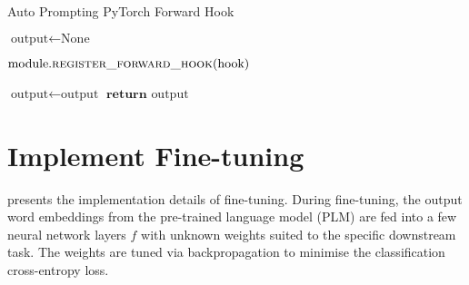 \begin{algorithm}
\caption{Auto Prompting PyTorch Forward Hook} \label{alg:appendix-auto-forward-hook}
\begin{algorithmic}[1]
\small
{}

\State $\text{output} \gets \text{None}$
{\color{mylightgrey}}

\State $\text{module}.\Call{\text{register\_forward\_hook}}{\text{hook}}$  
{\color{mylightgrey}}
\EndProcedure

  \State $\text{output} \gets \text{output}$ 
  {\color{mylightgrey}}
\EndProcedure
{}
  \State $\textbf{return } \text{output}$ 
  {\color{mylightgrey}}
\EndProcedure
\EndClass
\end{algorithmic}
\end{algorithm}

\section{Implement Fine-tuning} \label{sec:appendix-finetune}
 presents the implementation details of fine-tuning. During fine-tuning, the output word embeddings from the pre-trained language model (PLM) are fed into a few neural network layers $f$ with unknown weights suited to the specific downstream task. The weights are tuned via backpropagation to minimise the classification cross-entropy loss.

